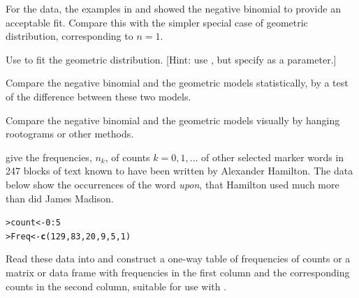 \documentclass[11pt]{report}\usepackage[]{graphicx}\usepackage[]{color}
\makeatletter
\newcommand{\hlnum}[1]{\textcolor[rgb]{0.686,0.059,0.569}{#1}}%
\newcommand{\hlopt}[1]{\textcolor[rgb]{0,0,0}{#1}}%
\newcommand{\hlstd}[1]{\textcolor[rgb]{0.345,0.345,0.345}{#1}}%
\newcommand{\hlkwb}[1]{\textcolor[rgb]{0.69,0.353,0.396}{#1}}%
\newcommand{\hlkwd}[1]{\textcolor[rgb]{0.737,0.353,0.396}{\textbf{#1}}}%
\newenvironment{kframe}{%
 \def\at@end@of@kframe{}%
 \ifinner\ifhmode%
  \def\at@end@of@kframe{\end{minipage}}%
  \begin{minipage}{\columnwidth}%
 \fi\fi%
 \def\FrameCommand##1{\hskip\@totalleftmargin \hskip-\fboxsep
 \colorbox{shadecolor}{##1}\hskip-\fboxsep
     \hskip-\linewidth \hskip-\@totalleftmargin \hskip\columnwidth}%
 \MakeFramed {\advance\hsize-\width
   \@totalleftmargin\z@ \linewidth\hsize
   \@setminipage}}%
 {\par\unskip\endMakeFramed%
 \at@end@of@kframe}
\newenvironment{knitrout}{}{} %
\renewenvironment{knitrout}{\small\renewcommand{\baselinestretch}{.85}}{} %
\makeatother
\begin{document}
\begin{Exercises}
\begin{enumerate*}
  \end{enumerate*}

  \exercise For the  data, the examples in  and
   showed the negative binomial to provide an acceptable fit.
  Compare this with the simpler special case of geometric distribution, corresponding
  to $n=1$.
  \begin{enumerate*}
    \item Use  to fit the geometric distribution. 
    [Hint: use , but specify  as a parameter.]
    \begin{ans}
    \end{ans}
    
    \item Compare the negative binomial and the geometric models statistically,
    by a \LR test of the difference between these two models.
    \begin{ans}
    \end{ans}
    
    \item Compare the negative binomial and the geometric models visually
    by hanging rootograms or other methods.
    \begin{ans}
    \end{ans}
    
  \end{enumerate*}

  \exercise \citet[Table 2.4]{MostellerWallace:63} give the frequencies, $n_k$,
  of counts $k = 0, 1, \dots$ of other selected marker words in 247 blocks
  of text known to have been written by Alexander Hamilton.  The data below
  show the occurrences of the word \emph{upon}, that Hamilton used much more than
  did James Madison.
\begin{knitrout}
\color{fgcolor}\begin{kframe}
\begin{alltt}
\hlstd{> }\hlstd{count} \hlkwb{<-} \hlnum{0} \hlopt{:} \hlnum{5}
\hlstd{> }\hlstd{Freq} \hlkwb{<-} \hlkwd{c}\hlstd{(}\hlnum{129}\hlstd{,} \hlnum{83}\hlstd{,} \hlnum{20}\hlstd{,} \hlnum{9}\hlstd{,} \hlnum{5}\hlstd{,} \hlnum{1}\hlstd{)}
\end{alltt}
\end{kframe}
\end{knitrout}
  \begin{enumerate*}
    \item Read these data into \R and construct a one-way table of frequencies of counts
    or a matrix or data frame with frequencies in the first column and the corresponding counts in the second column, suitable for use with .
    \begin{ans}
    \end{ans}
    

\end{enumerate*}
\end{Exercises}
\end{document}
